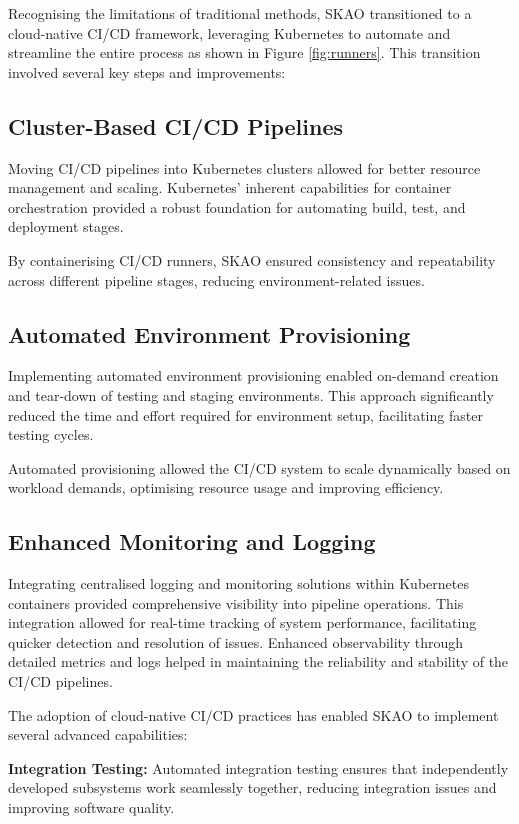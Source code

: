 \documentclass[a4paper]{spie}  %
\begin{document}
Recognising the limitations of traditional methods, SKAO transitioned to a cloud-native CI/CD framework, leveraging Kubernetes to automate and streamline the entire process as shown in Figure \ref{fig:runners}. This transition involved several key steps and improvements:

\subsection{Cluster-Based CI/CD Pipelines}

Moving CI/CD pipelines into Kubernetes clusters allowed for better resource management and scaling. Kubernetes' inherent capabilities for container orchestration provided a robust foundation for automating build, test, and deployment stages.

By containerising CI/CD runners, SKAO ensured consistency and repeatability across different pipeline stages, reducing environment-related issues.

\subsection{Automated Environment Provisioning}

Implementing automated environment provisioning enabled on-demand creation and tear-down of testing and staging environments. This approach significantly reduced the time and effort required for environment setup, facilitating faster testing cycles.

Automated provisioning allowed the CI/CD system to scale dynamically based on workload demands, optimising resource usage and improving efficiency.

\subsection{Enhanced Monitoring and Logging}

Integrating centralised logging and monitoring solutions within Kubernetes containers provided comprehensive visibility into pipeline operations. This integration allowed for real-time tracking of system performance, facilitating quicker detection and resolution of issues. Enhanced observability through detailed metrics and logs helped in maintaining the reliability and stability of the CI/CD pipelines. 

The adoption of cloud-native CI/CD practices has enabled SKAO to implement several advanced capabilities:

\textbf{Integration Testing:} Automated integration testing ensures that independently developed subsystems work seamlessly together, reducing integration issues and improving software quality.
\end{document}
